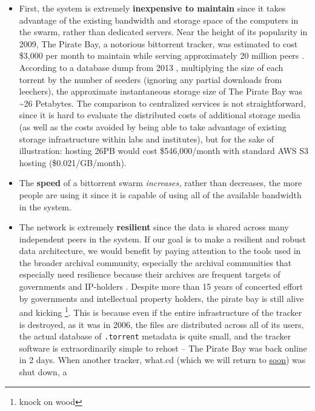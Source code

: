 \documentclass[11pt]{article}
\begin{document}
\begin{multicols}{2}
\begin{itemize}
\item
  First, the system is extremely \textbf{inexpensive to maintain} since
  it takes advantage of the existing bandwidth and storage space of the
  computers in the swarm, rather than dedicated servers. Near the height
  of its popularity in 2009, The Pirate Bay, a notorious bittorrent
  tracker, was estimated to cost \$3,000 per month to maintain while
  serving approximately 20 million peers \cite{roettgersPirateBayDistributing2009} . According to a database dump
  from 2013 \cite{PirateBayArchiveteam2020} , multiplying the
  size of each torrent by the number of seeders (ignoring any partial
  downloads from leechers), the approximate instantaneous storage size
  of The Pirate Bay was \textasciitilde26 Petabytes. The comparison to
  centralized services is not straightforward, since it is hard to
  evaluate the distributed costs of additional storage media (as well as
  the costs avoided by being able to take advantage of existing storage
  infrastructure within labs and institutes), but for the sake of
  illustration: hosting 26PB would cost \$546,000/month with standard
  AWS S3 hosting (\$0.021/GB/month).
\item
  The \textbf{speed} of a bittorrent swarm \emph{increases,} rather than
  decreases, the more people are using it since it is capable of using
  all of the available bandwidth in the system.
\item
  The network is extremely \textbf{resilient} since the data is shared
  across many independent peers in the system. If our goal is to make a
  resilient and robust data architecture, we would benefit by paying
  attention to the tools used in the broader archival community,
  especially the archival communities that especially need resilience
  because their archives are frequent targets of governments and
  IP-holders\cite{spiesDataIntegrityLibrarians2017} . Despite
  more than 15 years of concerted effort by governments and intellectual
  property holders, the pirate bay is still alive and kicking \cite{kim15YearsPirate2019} \footnote{knock on wood}. This is because
  even if the entire infrastructure of the tracker is destroyed, as it
  was in 2006, the files are distributed across all of its users, the
  actual database of \texttt{.torrent} metadata is quite small, and the
  tracker software is extraordinarily simple to rehost \cite{vandersarOpenBayNow2014}  -- The Pirate Bay was back online in 2
  days. When another tracker, what.cd (which we will return to
  \protect\hyperlink{archives-need-communities}{soon}) was shut down, a

\end{itemize}
\end{multicols}
\end{document}
